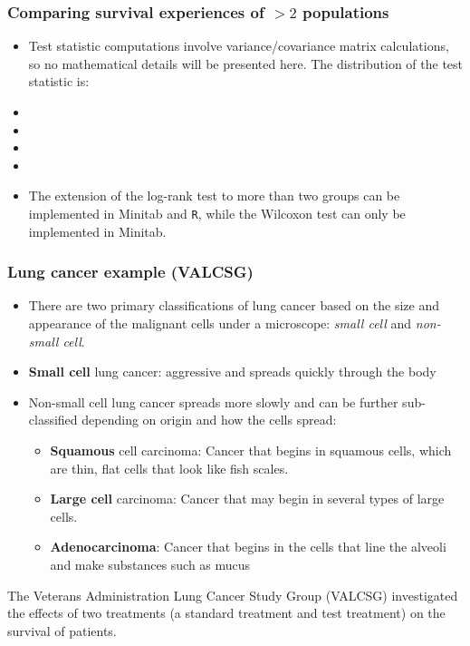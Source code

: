 \begin{frame}
\frametitle{Comparing survival experiences of $>2$ populations}
\begin{itemize}
\item Test statistic computations involve variance/covariance matrix calculations, so no mathematical details will be presented here. The distribution of the test statistic is:
\item[]
\item[]
\item[]
\item[]
\item The extension of the log-rank test to more than two groups can be implemented in Minitab and \texttt{R}, while the Wilcoxon test can only be implemented in Minitab.
\end{itemize}
\end{frame}

\begin{frame}
\frametitle{Lung cancer example (VALCSG)}
\small{
\begin{itemize}
\item There are two primary classifications of lung cancer based on the size and appearance of the malignant cells under a microscope: \textit{small cell} and \textit{non-small cell}.
\item \textbf{Small cell} lung cancer:  aggressive and spreads quickly through the body
\item Non-small cell lung cancer spreads more slowly and can be further sub-classified depending on origin and how the cells spread:
    \begin{itemize}
    \item \textbf{Squamous} cell carcinoma: Cancer that begins in squamous cells, which are thin, flat cells that look like fish scales.

    \item \textbf{Large cell} carcinoma: Cancer that may begin in several types of large cells.

    \item \textbf{Adenocarcinoma}: Cancer that begins in the cells that line the alveoli and make substances such as mucus
    \end{itemize}
\end{itemize}
The Veterans Administration Lung Cancer Study Group (VALCSG) investigated the effects of two treatments (a standard treatment and test treatment) on the survival of patients.}
\end{frame}

